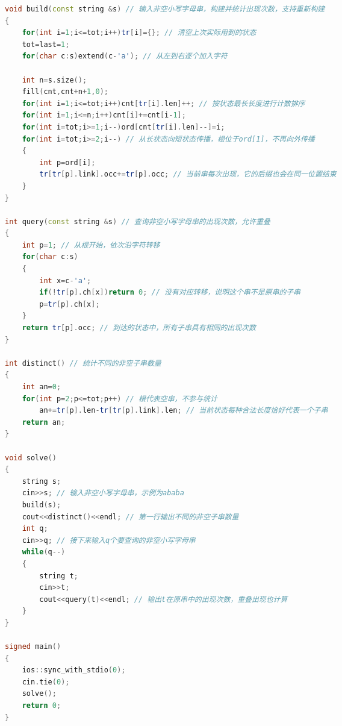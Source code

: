 \documentclass[10pt,landscape,a4paper]{article}
\begin{document}
\begin{multicols*}{3}
\begin{lstlisting}[language=C++]
void build(const string &s) // 输入非空小写字母串，构建并统计出现次数，支持重新构建
{
    for(int i=1;i<=tot;i++)tr[i]={}; // 清空上次实际用到的状态
    tot=last=1;
    for(char c:s)extend(c-'a'); // 从左到右逐个加入字符

    int n=s.size();
    fill(cnt,cnt+n+1,0);
    for(int i=1;i<=tot;i++)cnt[tr[i].len]++; // 按状态最长长度进行计数排序
    for(int i=1;i<=n;i++)cnt[i]+=cnt[i-1];
    for(int i=tot;i>=1;i--)ord[cnt[tr[i].len]--]=i;
    for(int i=tot;i>=2;i--) // 从长状态向短状态传播，根位于ord[1]，不再向外传播
    {
        int p=ord[i];
        tr[tr[p].link].occ+=tr[p].occ; // 当前串每次出现，它的后缀也会在同一位置结束
    }
}

int query(const string &s) // 查询非空小写字母串的出现次数，允许重叠
{
    int p=1; // 从根开始，依次沿字符转移
    for(char c:s)
    {
        int x=c-'a';
        if(!tr[p].ch[x])return 0; // 没有对应转移，说明这个串不是原串的子串
        p=tr[p].ch[x];
    }
    return tr[p].occ; // 到达的状态中，所有子串具有相同的出现次数
}

int distinct() // 统计不同的非空子串数量
{
    int an=0;
    for(int p=2;p<=tot;p++) // 根代表空串，不参与统计
        an+=tr[p].len-tr[tr[p].link].len; // 当前状态每种合法长度恰好代表一个子串
    return an;
}

void solve()
{
    string s;
    cin>>s; // 输入非空小写字母串，示例为ababa
    build(s);
    cout<<distinct()<<endl; // 第一行输出不同的非空子串数量
    int q;
    cin>>q; // 接下来输入q个要查询的非空小写字母串
    while(q--)
    {
        string t;
        cin>>t;
        cout<<query(t)<<endl; // 输出t在原串中的出现次数，重叠出现也计算
    }
}

signed main()
{
    ios::sync_with_stdio(0);
    cin.tie(0);
    solve();
    return 0;
}
\end{lstlisting}

\end{multicols*}
\end{document}
